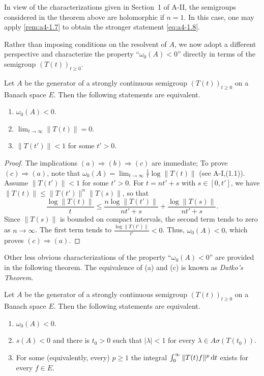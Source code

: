 In view of the characterizations given in Section~1 of A-II, the semigroups considered in the theorem above are holomorphic if $ n = 1 $. 
In this case, one may apply \eqref{rem:a4-1.7} to obtain the stronger statement \eqref{eq:a4-1.8}.

Rather than imposing conditions on the resolvent of $ A $, we now adopt a different perspective and characterize the property \enquote{$ \omega_{0}(A) < 0 $} directly in terms of the semigroup $ (T(t))_{t \geq 0} $.
\begin{proposition} \label{prop:a4-1.10} Let $ A $ be the generator of a strongly continuous semigroup $ (T(t))_{t \geq 0} $ on a Banach space $E$. 
Then the following statements are equivalent.
\begin{enumerate}[\upshape (a)]
\item  
$ \omega_{0}(A) < 0 $.
\item  
$ \lim_{t \to \infty} \| T(t) \| = 0 $.
\item  
$ \| T(t') \| < 1 $ for some $ t' > 0 $.
\end{enumerate}
\end{proposition}
\begin{proof}
The implications $(a)  \Rightarrow  (b)  \Rightarrow  (c) $ are immediate; To prove $(c)  \Rightarrow  (a) $, note that $\omega_{0}(A) = \lim_{t \to \infty} \frac{1}{t} \log \| T(t) \|$ (see A-I,(1.1)). Assume $\|T(t')\| <1$ for some $t'>0$. For $t=nt'+s$ with $s\in [0,t']$, we have $\|T(t)\|\le \|T(t')\|^n\|T(s)\|$, so that
\[
\displaystyle
\frac{\log \|T(t)\|}{t} \leq \frac{n\log \|T(t')\|}{nt'+s} + \frac{\log \|T(s)\|}{nt' + s}.
\]
Since $\|T(s)\|$ is bounded on compact intervals, the second term tends to zero as $n\to\infty$. The first term tends to $\frac{\log \|T(t')\|}{t'} < 0$. Thus, $\omega_0(A) < 0$, which proves  $(c)  \Rightarrow  (a) $.
\end{proof}
Other less obvious characterizations of the property 
\enquote{$ \omega_{0}(A) < 0 $} are provided in the following theorem. 
The equivalence of (a) and (c) is known as \emph{Datko’s Theorem}.
\begin{theorem} \label{thm:a4-1.11} 
Let $ A $ be the generator of a strongly continuous semigroup $ (T(t))_{t \geq 0} $ on a Banach space $ E $. 
Then the following statements are equivalent.
\begin{enumerate}[\upshape (a)]
\item
$ \omega_{0}(A) < 0 $.
\item
$ s(A) < 0 $ and there is $ t_0 > 0 $ such that  
$ |\lambda| < 1$ for every $ \lambda \in A\sigma (T(t_0)).$
\item
For some (equivalently, every) $ p \geq 1 $ the integral $ \int_{0}^{\infty} \| T(t) f \|^p\mathop{}\!\mathrm{d}{t} $ exists for every $ f \in E $.
\end{enumerate}
\end{theorem}
